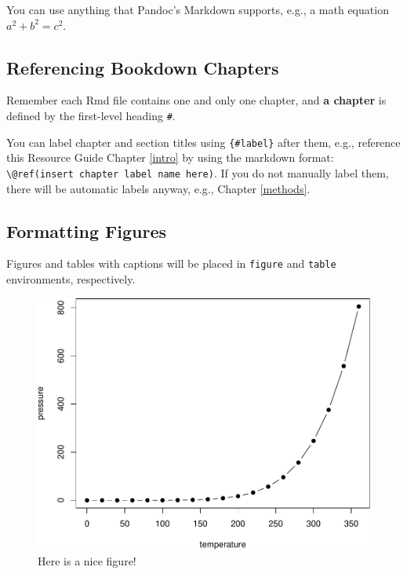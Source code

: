 \documentclass[
]{book}
\begin{document}
You can use anything that Pandoc's Markdown supports, e.g., a math equation \(a^2 + b^2 = c^2\).

\hypertarget{referencing-bookdown-chapters}{%
\subsection{Referencing Bookdown Chapters}\label{referencing-bookdown-chapters}}

Remember each Rmd file contains one and only one chapter, and \textbf{a chapter} is defined by the first-level heading \texttt{\#}.

You can label chapter and section titles using \texttt{\{\#label\}} after them, e.g., reference this Resource Guide Chapter \ref{intro} by using the markdown format: \texttt{\textbackslash{}@ref(insert\ chapter\ label\ name\ here)}. If you do not manually label them, there will be automatic labels anyway, e.g., Chapter \ref{methods}.

\hypertarget{formatting-figures}{%
\subsection{Formatting Figures}\label{formatting-figures}}

Figures and tables with captions will be placed in \texttt{figure} and \texttt{table} environments, respectively.

\begin{figure}

{\centering \includegraphics[width=0.8\linewidth]{bookdown-demo_files/figure-latex/nice-fig-1} 

}

\caption{Here is a nice figure!}\label{fig:nice-fig}
\end{figure}
\end{document}
